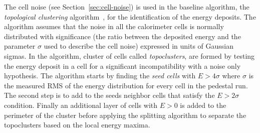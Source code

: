 The cell noise (see Section~\ref{sec:cell-noise}) is used in the baseline
algorithm, the \emph{topological clustering} algorithm~\cite{JetCluster}, for
the identification of the energy deposits. The algorithm assumes that the noise
in all the calorimeter cells is normally distributed with significance (the
ratio between the deposited energy and the parameter $\sigma$ used to describe
the cell noise) expressed in units of Gaussian sigmas. In the algorithm, cluster
of cells called \emph{topoclusters}, are formed by testing the energy deposit in
a cell for a significant incompatibility with a noise only hypothesis. The
algorithm starts by finding the \emph{seed cells} with $E > 4 \sigma$ where
$\sigma$ is the measured RMS of the energy distribution for every cell in the
pedestal run. The second step is to add to the seeds neighbor cells that satisfy
the $E > 2 \sigma$ condition. Finally an additional layer of cells with $E > 0$
is added to the perimeter of the cluster before applying the splitting algorithm
to separate the topoclusters based on the local energy maxima.

